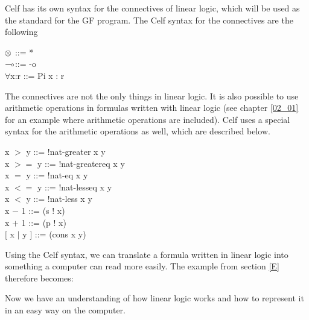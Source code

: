 Celf has its own syntax for the connectives of linear logic, which will be used as the standard for the GF program. The Celf syntax for the connectives are the following
\begin{texto}
	$\otimes$\hspace{40pt} ::= * \\
	$\multimap$\hspace{40pt}::= -o \\
	$\forall$x:r\hspace{30pt} ::= Pi x : r \\
\end{texto}
The connectives are not the only things in linear logic. It is also possible to use arithmetic operations in formulas written with linear logic (see chapter \ref{02_01} for an example where arithmetic operations are included). Celf uses a special syntax for the arithmetic operations as well, which are described below.
\begin{texto}
	x $>$ y\hspace{22.8pt} ::= !nat-greater x y \\
	x $>=$ y\hspace{15pt} ::= !nat-greatereq x y \\
	x $=$ y\hspace{22.8pt} ::= !nat-eq x y \\
	x $<=$ y\hspace{15pt} ::= !nat-lesseq x y \\
	x $<$ y\hspace{22.8pt} ::= !nat-less x y \\
 	x $-$ 1\hspace{22.8pt} ::= (s ! x) \\
 	x $+$ 1\hspace{22.8pt} ::= (p ! x) \\
	$\lbrack$ x $|$ y $\rbrack$ \hspace{12pt} ::= (cons x y)
\end{texto}
Using the Celf syntax, we can translate a formula written in linear logic into something a computer can read more easily. The example from section \ref{E} therefore becomes:
\begin{texto}
\end{texto}

Now we have an understanding of how linear logic works and how to represent it in an easy way on the computer. \\
 \\
